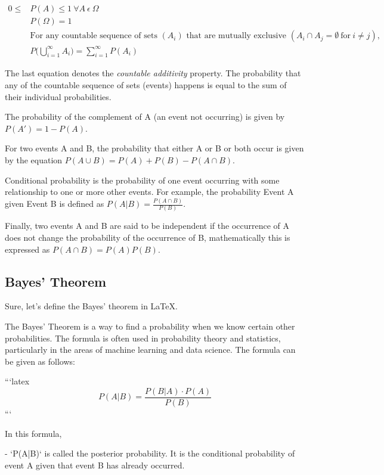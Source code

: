 \begin{align*}
0 \leq & P(A) \leq 1 \ \forall A \ \epsilon \ \Omega \\
& P(\Omega)=1 \\
& \text{For any countable sequence of sets } (A_{i}) \text{ that are mutually exclusive }(A_{i} \cap A_{j}= \emptyset \ \text{for} \ i \neq j), \\
& P \Biggl( \bigcup_{i=1}^{\infty} A_{i} \Biggr) = \sum_{i=1}^{\infty}  P(A_{i})
\end{align*}

The last equation denotes the \textit{countable additivity} property. The probability that any of the countable sequence of sets (events) happens is equal to the sum of their individual probabilities.

The probability of the complement of A (an event not occurring) is given by $P(A') = 1- P(A)$.

For two events A and B, the probability that either A or B or both occur is given by the equation $P(A \cup B) = P(A) + P(B) - P(A \cap B)$.

Conditional probability is the probability of one event occurring with some relationship to one or more other events. For example, the probability Event A given Event B is defined as $ P(A|B) = \frac{P(A \cap B)}{P(B)}$.

Finally, two events A and B are said to be independent if the occurrence of A does not change the probability of the occurrence of B, mathematically this is expressed as $P(A \cap B) = P(A)P(B)$.


\subsection{Bayes’ Theorem}
Sure, let's define the Bayes' theorem in LaTeX. 

The Bayes' Theorem is a way to find a probability when we know certain other probabilities. The formula is often used in probability theory and statistics, particularly in the areas of machine learning and data science. The formula can be given as follows:

```latex
\begin{equation}
P(A|B) = \frac{P(B|A) \cdot P(A)}{P(B)}
\end{equation}
```

In this formula, 

- `P(A|B)` is called the posterior probability. It is the conditional probability of event A given that event B has already occurred. 

